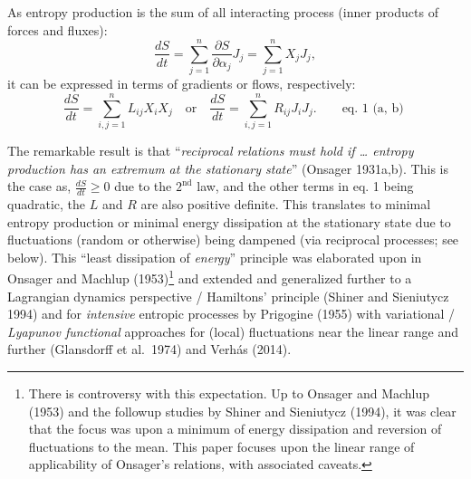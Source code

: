\documentclass[11pt,letterpaper,]{paper}
\begin{document}
As entropy production is the sum of all interacting process (inner
products of forces and fluxes):
\[\frac{dS}{dt} = \sum_{j=1}^{n}  \frac{\partial S}{\partial \alpha_j } J_j =\sum_{j=1}^{n} X_j J_j,\]
it can be expressed in terms of gradients or flows, respectively:
\[\frac{dS}{dt} = \sum_{i,j=1}^{n} L_{ij} X_i X_j \quad \text{or} \quad \frac{dS}{dt} = \sum_{i,j=1}^{n} R_{ij} J_i J_j. \qquad \text{eq. 1 (a, b) }\]

The remarkable result is that ``\emph{reciprocal relations must hold if
\ldots{} entropy production has an extremum at the stationary state}''
(Onsager 1931a,b). This is the case as, \(\frac{dS}{dt} \geq 0\) due to
the \(2^\text{nd}\) law, and the other terms in eq. 1 being quadratic,
the \(L\) and \(R\) are also positive definite. This translates to
minimal entropy production or minimal energy dissipation at the
stationary state due to fluctuations (random or otherwise) being
dampened (via reciprocal processes; see below). This ``least dissipation
of \emph{energy}'' principle was elaborated upon in Onsager and Machlup
(1953)\footnote{There is controversy with this expectation. Up to
  Onsager and Machlup (1953) and the followup studies by Shiner and
  Sieniutycz (1994), it was clear that the focus was upon a minimum of
  energy dissipation and reversion of fluctuations to the mean. This
  paper focuses upon the linear range of applicability of Onsager's
  relations, with associated caveats.} and extended and generalized
further to a Lagrangian dynamics perspective / Hamiltons' principle
(Shiner and Sieniutycz 1994) and for \emph{intensive} entropic processes
by Prigogine (1955) with variational / \emph{Lyapunov functional}
approaches for (local) fluctuations near the linear range and further
(Glansdorff et al.~1974) and Verhás (2014).
\end{document}
